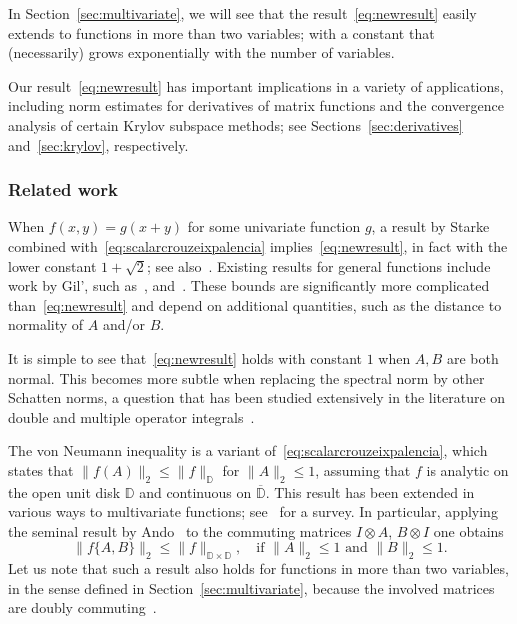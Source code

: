 \documentclass[11pt,a4paper]{amsart}
\begin{document}
In Section~\ref{sec:multivariate}, we will see that the result~\eqref{eq:newresult} easily extends to functions in more than two variables; with a constant that (necessarily) grows exponentially with the number of variables.

Our result~\eqref{eq:newresult} has important implications in a variety of applications, including norm estimates for derivatives of matrix functions and the convergence analysis of certain Krylov subspace methods; see Sections~\ref{sec:derivatives} and~\ref{sec:krylov}, respectively.

\subsubsection*{Related work}
When $f(x,y) = g(x+y)$ for some univariate function $g$, a result by Starke~\cite[Corollary 3.2]{Starke1993} combined with~\eqref{eq:scalarcrouzeixpalencia} implies~\eqref{eq:newresult}, in fact with the lower constant $1+\sqrt{2}$; see also~\cite[Remark 1]{Kressner2019bivariate}. Existing results for general functions include work by Gil', such as~\cite[Theorem 1.1]{Gil2011}, and~\cite[Lemma 3]{Kressner2019bivariate}. These bounds are significantly more complicated than~\eqref{eq:newresult} and depend on additional quantities, such as the distance to normality of $A$ and/or $B$.

It is simple to see that~\eqref{eq:newresult} holds with constant $1$ when $A,B$ are both normal. This becomes more subtle when replacing the spectral norm by other Schatten norms, a question that has been studied extensively in the literature on double and multiple operator integrals~\cite{Skripka2019}.

The von Neumann inequality is a variant of~\eqref{eq:scalarcrouzeixpalencia}, which states that $\|f(A)\|_2 \le \|f\|_{\mathbb D}$ for $\|A\|_2 \le 1$, assuming that $f$ is analytic on the open unit disk $\mathbb D$ and continuous on $\overline{\mathbb D}$. This result has been extended in various ways to multivariate functions; see~\cite[Sec. 37.4]{BadeaBeckermann2013} for a survey. In particular, applying the seminal result by Ando~\cite{Ando1963} to the commuting matrices 
$I\otimes A$, $B \otimes I$ one obtains
\begin{equation} \label{eq:ando}
 \|f\{A,B\}\|_2 \le \|f\|_{\mathbb D \times \mathbb D}, \quad \text{if $\|A\|_2 \le 1$ and $\|B\|_2 \le 1$.}
\end{equation}
Let us note that such a result also holds for functions in more than two variables, in the sense defined in Section~\ref{sec:multivariate}, because the involved matrices are doubly commuting~\cite[Sec. 1.5.9 (g)]{Nikolski2002}.
\end{document}
